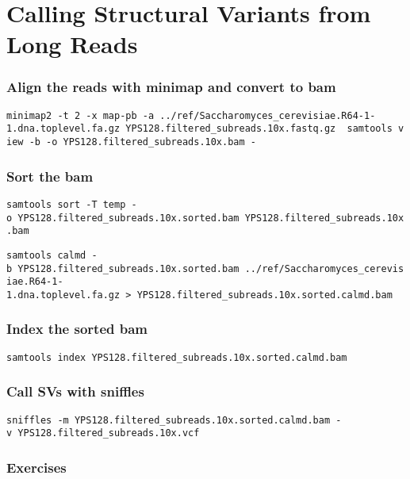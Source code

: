 \documentclass[11pt]{article}
\begin{document}
    \hypertarget{calling-structural-variants-from-long-reads}{%
\section{Calling Structural Variants from Long
Reads}\label{calling-structural-variants-from-long-reads}}

\hypertarget{align-the-reads-with-minimap-and-convert-to-bam}{%
\subsubsection{Align the reads with minimap and convert to
bam}\label{align-the-reads-with-minimap-and-convert-to-bam}}

\texttt{minimap2\ -t\ 2\ -x\ map-pb\ -a\ ../ref/Saccharomyces\_cerevisiae.R64-1-1.dna.toplevel.fa.gz\ YPS128.filtered\_subreads.10x.fastq.gz\ \textbar{}\ samtools\ view\ -b\ -o\ YPS128.filtered\_subreads.10x.bam\ -}

\hypertarget{sort-the-bam}{%
\subsubsection{Sort the bam}\label{sort-the-bam}}

\texttt{samtools\ sort\ -T\ temp\ -o\ YPS128.filtered\_subreads.10x.sorted.bam\ YPS128.filtered\_subreads.10x.bam}

\texttt{samtools\ calmd\ -b\ YPS128.filtered\_subreads.10x.sorted.bam\ ../ref/Saccharomyces\_cerevisiae.R64-1-1.dna.toplevel.fa.gz\ \textgreater{}\ YPS128.filtered\_subreads.10x.sorted.calmd.bam}

\hypertarget{index-the-sorted-bam}{%
\subsubsection{Index the sorted bam}\label{index-the-sorted-bam}}

\texttt{samtools\ index\ YPS128.filtered\_subreads.10x.sorted.calmd.bam}

\hypertarget{call-svs-with-sniffles}{%
\subsubsection{Call SVs with sniffles}\label{call-svs-with-sniffles}}

\texttt{sniffles\ -m\ YPS128.filtered\_subreads.10x.sorted.calmd.bam\ -v\ YPS128.filtered\_subreads.10x.vcf}

\hypertarget{exercises}{%
\subsubsection{Exercises}\label{exercises}}
\end{document}

